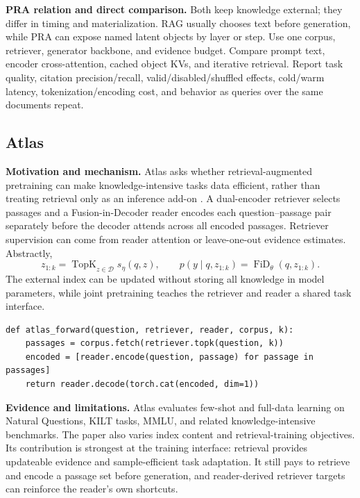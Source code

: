 \textbf{PRA relation and direct comparison.} Both keep knowledge external; they differ in
timing and materialization.  RAG usually chooses text before generation, while PRA can
expose named latent objects by layer or step.  Use one corpus, retriever, generator backbone,
and evidence budget.  Compare prompt text, encoder cross-attention, cached object KVs, and
iterative retrieval.  Report task quality, citation precision/recall, valid/disabled/shuffled
effects, cold/warm latency, tokenization/encoding cost, and behavior as queries over the same
documents repeat.

\subsection{Atlas}

\textbf{Motivation and mechanism.} Atlas asks whether retrieval-augmented pretraining can
make knowledge-intensive tasks data efficient, rather than treating retrieval only as an
inference add-on \citep{izacard2022atlas}. A dual-encoder retriever selects passages and a
Fusion-in-Decoder reader encodes each question--passage pair separately before the decoder
attends across all encoded passages. Retriever supervision can come from reader attention
or leave-one-out evidence estimates. Abstractly,
\begin{equation}
z_{1:k}=\operatorname{TopK}_{z\in\mathcal D}s_\eta(q,z),\qquad
p(y\mid q,z_{1:k})=\operatorname{FiD}_\theta(q,z_{1:k}).
\end{equation}
The external index can be updated without storing all knowledge in model parameters, while
joint pretraining teaches the retriever and reader a shared task interface.

\begin{lstlisting}[caption={Atlas-style retrieve, encode separately, and fuse in the decoder}]
def atlas_forward(question, retriever, reader, corpus, k):
    passages = corpus.fetch(retriever.topk(question, k))
    encoded = [reader.encode(question, passage) for passage in passages]
    return reader.decode(torch.cat(encoded, dim=1))
\end{lstlisting}

\textbf{Evidence and limitations.} Atlas evaluates few-shot and full-data learning on
Natural Questions, KILT tasks, MMLU, and related knowledge-intensive benchmarks. The paper
also varies index content and retrieval-training objectives. Its contribution is strongest
at the training interface: retrieval provides updateable evidence and sample-efficient task
adaptation. It still pays to retrieve and encode a passage set before generation, and
reader-derived retriever targets can reinforce the reader's own shortcuts.

